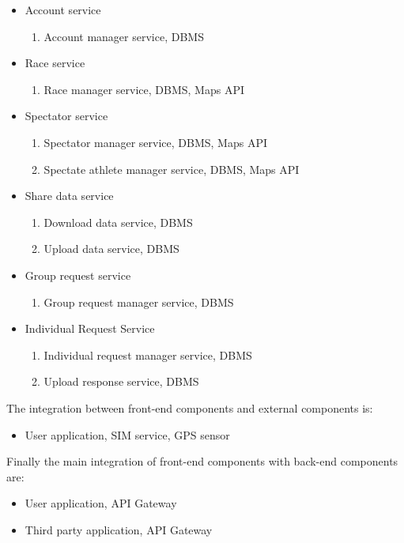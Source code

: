 \begin{itemize}
\item Account service
\begin{enumerate}
\item Account manager service, DBMS
\end{enumerate}
\item Race service
\begin{enumerate}
\item Race manager service, DBMS, Maps API
\end{enumerate}
\item Spectator service
\begin{enumerate}
\item Spectator manager service, DBMS, Maps API
\item Spectate athlete manager service, DBMS, Maps API
\end{enumerate}
\item Share data service
\begin{enumerate}
\item Download data service, DBMS
\item Upload data service, DBMS
\end{enumerate}
\item Group request service
\begin{enumerate}
\item Group request manager service, DBMS
\end{enumerate}
\item Individual Request Service
\begin{enumerate}
\item Individual request manager service, DBMS
\item Upload response service, DBMS
\end{enumerate}
\end{itemize}
The integration between front-end components and external components is:
\begin{itemize}
\item User application, SIM service, GPS sensor
\end{itemize}
Finally the main integration of front-end components with back-end components are: 
\begin{itemize}
\item User application, API Gateway
\item Third party application, API Gateway
\end{itemize}
